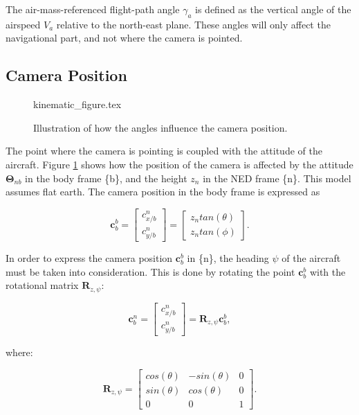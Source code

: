 The air-mass-referenced flight-path angle $\gamma_a$ is defined as the vertical angle of the airspeed $V_a$ relative to the north-east plane. These angles will only affect the navigational part, and not where the camera is pointed.


\subsection{Camera Position}

\begin{figure}
	{kinematic_figure.tex}
	\caption{Illustration of how the angles influence the camera position.}
	\label{fig:camera_kinematics}
\end{figure}
	
The point where the camera is pointing is coupled with the attitude of the aircraft. Figure \ref{fig:camera_kinematics} shows how the position of the camera is affected by the attitude $\bm{\Theta}_{nb}$ in the body frame \{b\}, and the height $z_n$ in the NED frame \{n\}. This model assumes flat earth. The camera position in the body frame is expressed as

\begin{equation} \label{eq:camera_pos}
	\bm{c}_b^b =
	\begin{bmatrix}
		c_{x/b}^n \\
		c_{y/b}^n
	\end{bmatrix}
	=
	\begin{bmatrix}
		z_n tan(\theta) \\
		z_n tan(\phi)
	\end{bmatrix}.
\end{equation}

In order to express the camera position $\bm{c}_b^b$ in \{n\}, the heading $\psi$ of the aircraft must be taken into consideration. This is done by rotating the point $\bm{c}_b^b$ with the rotational matrix $\bm{R}_{z,\psi}$:

\begin{equation} \label{eq:body_ned_rotate}
	\bm{c}_b^n =
	\begin{bmatrix}
		c_{x/b}^n \\
		c_{y/b}^n
	\end{bmatrix}
	= \bm{R}_{z,\psi} \bm{c}_b^b,
\end{equation}

where:

\begin{equation}
	\bm{R}_{z,\psi} = 
	\begin{bmatrix}
		cos(\theta) & -sin(\theta) & 0 \\
		sin(\theta) & cos(\theta) & 0 \\
		0 & 0 & 1
	\end{bmatrix}.
\end{equation}

